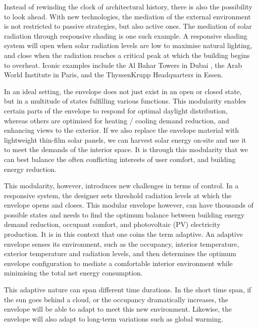 Instead of rewinding the clock of architectural history, there is also the possibility to look ahead. With new technologies, the mediation of the external environment is not restricted to passive strategies, but also active ones. The mediation of solar radiation through responsive shading is one such example. A responsive shading system will open when solar radiation levels are low to maximise natural lighting, and close when the radiation reaches a critical peak at which the building begins to overheat. Iconic examples include the Al Bahar Towers in Dubai \cite{oborn2012bahr}, the Arab World Institute in Paris, and the ThyssenKrupp Headquarters in Essen. 


In an ideal setting, the envelope does not just exist in an open or closed state, but in a multitude of states fulfilling various functions. This modularity enables certain parts of the envelope to respond for optimal daylight distribution, whereas others are optimised for heating / cooling demand reduction, and enhancing views to the exterior. If we also replace the envelope material with lightweight thin-film solar panels, we can harvest solar energy on-site and use it to meet the demands of the interior space. It is through this modularity that we can best balance the often conflicting interests of user comfort, and building energy reduction.

This modularity, however, introduces new challenges in terms of control. In a responsive system, the designer sets threshold radiation levels at which the envelope opens and closes. This modular envelope however, can have thousands of possible states and needs to find the optimum balance between building energy demand reduction, occupant comfort, and photovoltaic (PV) electricity production. It is in this context that one coins the term adaptive. An adaptive envelope senses its environment, such as the occupancy, interior temperature, exterior temperature and radiation levels, and then determines the optimum envelope configuration to mediate a comfortable interior environment while minimising the total net energy consumption. 

This adaptive nature can span different time durations. In the short time span, if the sun goes behind a cloud, or the occupancy dramatically increases, the envelope will be able to adapt to meet this new environment. Likewise, the envelope will also adapt to long-term variations such as global warming. 

